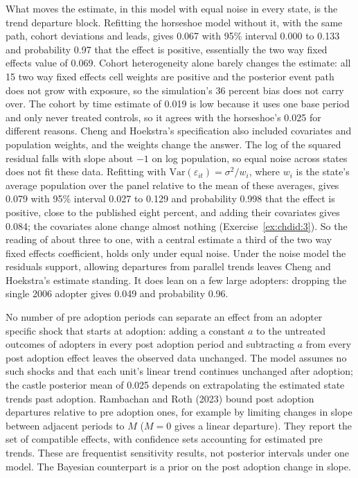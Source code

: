 What moves the estimate, in this model with equal noise in every state, is the trend departure block. Refitting the horseshoe model without it, with the same path, cohort deviations and leads, gives 0.067 with 95\% interval 0.000 to 0.133 and probability 0.97 that the effect is positive, essentially the two way fixed effects value of 0.069. Cohort heterogeneity alone barely changes the estimate: all 15 two way fixed effects cell weights are positive and the posterior event path does not grow with exposure, so the simulation's 36 percent bias does not carry over. The cohort by time estimate of 0.019 is low because it uses one base period and only never treated controls, so it agrees with the horseshoe's 0.025 for different reasons. Cheng and Hoekstra's specification also included covariates and population weights, and the weights change the answer. The log of the squared residual falls with slope about $-1$ on log population, so equal noise across states does not fit these data. Refitting with $\mathrm{Var}(\varepsilon_{it}) = \sigma^2/w_i$, where $w_i$ is the state's average population over the panel relative to the mean of these averages, gives 0.079 with 95\% interval 0.027 to 0.129 and probability 0.998 that the effect is positive, close to the published eight percent, and adding their covariates gives 0.084; the covariates alone change almost nothing (Exercise~\ref{ex:chdid:3}). So the reading of about three to one, with a central estimate a third of the two way fixed effects coefficient, holds only under equal noise. Under the noise model the residuals support, allowing departures from parallel trends leaves Cheng and Hoekstra's estimate standing. It does lean on a few large adopters: dropping the single 2006 adopter gives 0.049 and probability 0.96.

No number of pre adoption periods can separate an effect from an adopter specific shock that starts at adoption: adding a constant $a$ to the untreated outcomes of adopters in every post adoption period and subtracting $a$ from every post adoption effect leaves the observed data unchanged. The model assumes no such shocks and that each unit's linear trend continues unchanged after adoption; the castle posterior mean of 0.025 depends on extrapolating the estimated state trends past adoption. Rambachan and Roth (2023) bound post adoption departures relative to pre adoption ones, for example by limiting changes in slope between adjacent periods to $M$ ($M = 0$ gives a linear departure). They report the set of compatible effects, with confidence sets accounting for estimated pre trends. These are frequentist sensitivity results, not posterior intervals under one model. The Bayesian counterpart is a prior on the post adoption change in slope.

